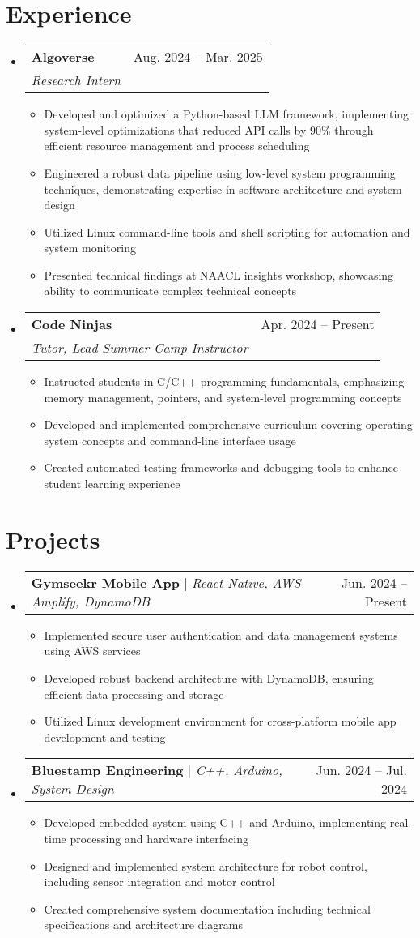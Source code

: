 \documentclass[letterpaper,11pt]{article}
\makeatletter
\newcommand{\resumeItem}[1]{
  \item\small{
    {#1 \vspace{-2pt}}
  }
}
\newcommand{\resumeSubheading}[4]{
  \vspace{-2pt}\item
    \begin{tabular*}{0.97\textwidth}[t]{l@{\extracolsep{\fill}}r}
      \textbf{#1} & #2 \\
      \textit{\small#3} & \textit{\small #4} \\
    \end{tabular*}\vspace{-7pt}
}
\newcommand{\resumeProjectHeading}[2]{
    \item
    \begin{tabular*}{0.97\textwidth}{l@{\extracolsep{\fill}}r}
      \small#1 & #2 \\
    \end{tabular*}\vspace{-7pt}
}
\newcommand{\resumeSubHeadingListStart}{\begin{itemize}[leftmargin=0.15in, label={}]}
\newcommand{\resumeSubHeadingListEnd}{\end{itemize}}
\newcommand{\resumeItemListStart}{\begin{itemize}}
\newcommand{\resumeItemListEnd}{\end{itemize}\vspace{-5pt}}
\makeatother
\begin{document}
\section{Experience}
  \resumeSubHeadingListStart
    \resumeSubheading
      {Algoverse}{Aug. 2024 -- Mar. 2025}
      {Research Intern}{}
      \resumeItemListStart
        \resumeItem{Developed and optimized a Python-based LLM framework, implementing system-level optimizations that reduced API calls by 90\% through efficient resource management and process scheduling}
        \resumeItem{Engineered a robust data pipeline using low-level system programming techniques, demonstrating expertise in software architecture and system design}
        \resumeItem{Utilized Linux command-line tools and shell scripting for automation and system monitoring}
        \resumeItem{Presented technical findings at NAACL insights workshop, showcasing ability to communicate complex technical concepts}
      \resumeItemListEnd

    \resumeSubheading
      {Code Ninjas}{Apr. 2024 -- Present}
      {Tutor, Lead Summer Camp Instructor}{}
      \resumeItemListStart
        \resumeItem{Instructed students in C/C++ programming fundamentals, emphasizing memory management, pointers, and system-level programming concepts}
        \resumeItem{Developed and implemented comprehensive curriculum covering operating system concepts and command-line interface usage}
        \resumeItem{Created automated testing frameworks and debugging tools to enhance student learning experience}
      \resumeItemListEnd

  \resumeSubHeadingListEnd


\section{Projects}
    \resumeSubHeadingListStart
      \resumeProjectHeading
          {\textbf{Gymseekr Mobile App} $|$ \emph{React Native, AWS Amplify, DynamoDB}}{Jun. 2024 -- Present}
          \resumeItemListStart
            \resumeItem{Implemented secure user authentication and data management systems using AWS services}
            \resumeItem{Developed robust backend architecture with DynamoDB, ensuring efficient data processing and storage}
            \resumeItem{Utilized Linux development environment for cross-platform mobile app development and testing}
          \resumeItemListEnd
      \resumeProjectHeading
          {\textbf{Bluestamp Engineering} $|$ \emph{C++, Arduino, System Design}}{Jun. 2024 -- Jul. 2024}
          \resumeItemListStart
            \resumeItem{Developed embedded system using C++ and Arduino, implementing real-time processing and hardware interfacing}
            \resumeItem{Designed and implemented system architecture for robot control, including sensor integration and motor control}
            \resumeItem{Created comprehensive system documentation including technical specifications and architecture diagrams}
          \resumeItemListEnd
    \resumeSubHeadingListEnd
\end{document}
